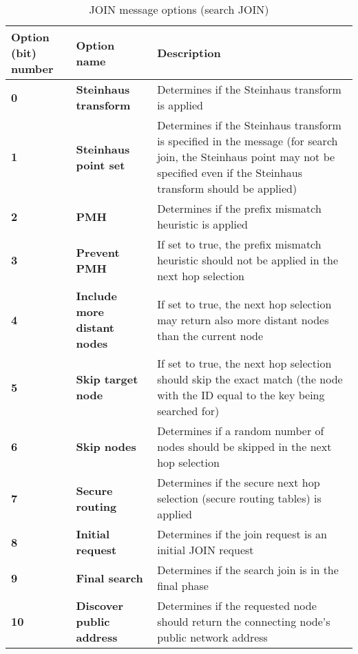 \begin{table}[H]
\scriptsize
\begin{center}
\begin{tabular}{p{2.7cm} p{3.3cm} p{8.5cm}}
	\hline
	\textbf{Option (bit) number}			& \textbf{Option name}					& \textbf{Description}				\\[1mm]
    \hline
	\textbf{0}								& \textbf{Steinhaus transform}			& Determines if the Steinhaus transform is applied						\\[1.5mm]
	\textbf{1}								& \textbf{Steinhaus point set}			& Determines if the Steinhaus transform is specified in the message	(for search join, the Steinhaus point may not be specified even if the Steinhaus transform should be applied)					\\[1.5mm]
    \textbf{2}								& \textbf{PMH}							& Determines if the prefix mismatch heuristic is applied				\\[1.5mm]
	\textbf{3}								& \textbf{Prevent PMH}					& If set to true, the prefix mismatch heuristic should not be applied in the next hop selection			\\[1.5mm]
	\textbf{4}								& \textbf{Include more distant nodes}	& If set to true, the next hop selection may return also more distant nodes than the current node		\\[1.5mm]
	\textbf{5}								& \textbf{Skip target node}				& If set to true, the next hop selection should skip the exact match (the node with the ID equal to the key being searched for)			\\[1.5mm]
	\textbf{6}								& \textbf{Skip nodes}					& Determines if a random number of nodes should be skipped in the next hop selection					\\[1.5mm]
	\textbf{7}								& \textbf{Secure routing}				& Determines if the secure next hop selection (secure routing tables) is applied						\\[1.5mm]
	\textbf{8}								& \textbf{Initial request}				& Determines if the join request is an initial JOIN request				\\[1.5mm]	
	\textbf{9}								& \textbf{Final search}					& Determines if the search join is in the final phase					\\[1.5mm]	
	\textbf{10}								& \textbf{Discover public address}		& Determines if the requested node should return the connecting node's public network address			\\[1.5mm]
    \hline
\end{tabular}
\end{center}
\caption{JOIN message options (search JOIN)}
\label{tab:mSearchJoinOptions}
\end{table}





